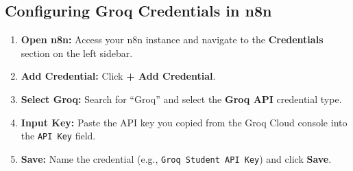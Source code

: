 \documentclass[12pt,a4paper]{article}
\begin{document}
\subsection{Configuring Groq Credentials in n8n}
\begin{enumerate}[label=\textbf{Step \arabic*.}]
    \item \textbf{Open n8n:} Access your n8n instance and navigate to the \textbf{Credentials} section on the left sidebar.
    \item \textbf{Add Credential:} Click \textbf{+ Add Credential}.
    \item \textbf{Select Groq:} Search for ``Groq'' and select the \textbf{Groq API} credential type.
    \item \textbf{Input Key:} Paste the API key you copied from the Groq Cloud console into the \texttt{API Key} field.
    \item \textbf{Save:} Name the credential (e.g., \texttt{Groq Student API Key}) and click \textbf{Save}.
\end{enumerate}
\end{document}
